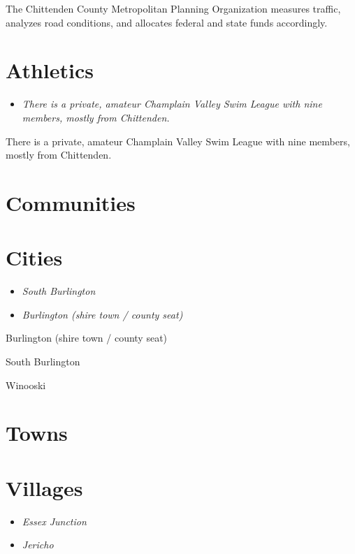 The Chittenden County Metropolitan Planning Organization measures
traffic, analyzes road conditions, and allocates federal and state funds
accordingly.

\section{Athletics}\label{athletics}

\begin{itemize}
\item
  \emph{There is a private, amateur Champlain Valley Swim League with
  nine members, mostly from Chittenden.}
\end{itemize}

There is a private, amateur Champlain Valley Swim League with nine
members, mostly from Chittenden.

\section{Communities}\label{communities}

\section{Cities}\label{cities}

\begin{itemize}
\item
  \emph{South Burlington}
\item
  \emph{Burlington (shire town / county seat)}
\end{itemize}

Burlington (shire town / county seat)

South Burlington

Winooski

\section{Towns}\label{towns}

\section{Villages}\label{villages}

\begin{itemize}
\item
  \emph{Essex Junction}
\item
  \emph{Jericho}
\end{itemize}


